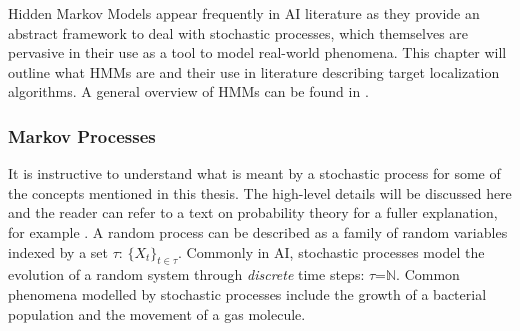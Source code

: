\placeholder{}
Hidden Markov Models appear frequently in AI literature as they provide an abstract framework to deal with stochastic processes, which themselves are pervasive in their use as a tool to model real-world phenomena. This chapter will outline what HMMs are and their use in literature describing target localization algorithms. A general overview of HMMs can be found in \cite{Murphy1994DynamicLearning}\cite{Ghahramani2001ANNETWORKS}.

\subsubsection{Markov Processes}
It is instructive to understand what is meant by a stochastic process for some of the concepts mentioned in this thesis. The high-level details will be discussed here and the reader can refer to a text on probability theory for a fuller explanation, for example \cite{papoulis02}. A random process can be described as a family of random variables indexed by a set $\tau$: $\{X_t\}_{t\in\tau}$. Commonly in AI, stochastic processes model the evolution of a random system through \textit{discrete} time steps: $\tau$=$\mathbb N$. Common phenomena modelled by stochastic processes include the growth of a bacterial population and the movement of a gas molecule.\par


